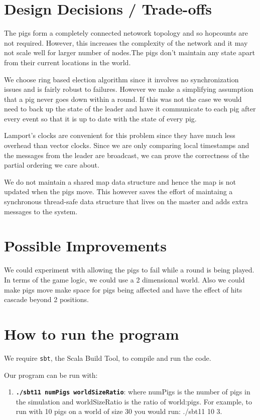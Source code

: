 \documentclass[]{article}
\begin{document}
\section{Design Decisions / Trade-offs}

The pigs form a completely connected netowork topology and so hopcounts are not
required. However, this increases the complexity of the network and it may not
scale well for larger number of nodes.The pigs don't maintain any state apart
from their current locations in the world.

We choose ring based election algorithm since it involves no synchronization
issues and is fairly robust to failures. However we make a simplifying
assumption that a pig never goes down within a round. If this was not the case
we would need to back up the state of the leader and have it communicate to
each pig after every event so that it is up to date with the state of every
pig.

Lamport's clocks are convenient for this problem since they have much less
overhead than vector clocks. Since we are only comparing local timestamps and
the messages from the leader are broadcast, we can prove the correctness of the
partial ordering we care about.

We do not maintain a shared map data structure and hence the map is not updated
when the pigs move. This however saves the effort of maintaing a synchronous
thread-safe data structure that lives on the master and adds extra messages to
the system.

\section{Possible Improvements}

We could experiment with allowing the pigs to fail while a round is being played. 
In terms of the game logic, we could use a 2
dimensional world. Also we could make pigs move make space for pigs
being affected and have the effect of hits cascade beyond 2 positions.

\section{How to run the program}

We require \texttt{sbt}, the Scala Build Tool, to compile and run the code.

Our program can be run with:

\begin{enumerate}[1.]
\item
  \textbf{\texttt{./sbt11 numPigs worldSizeRatio}}: where numPigs is the number of pigs in the simulation and worldSizeRatio is the ratio of world:pigs. For example, to run with 10 pigs on a world of size 30 you would run: ./sbt11 10 3.
\end{enumerate}
\end{document}
